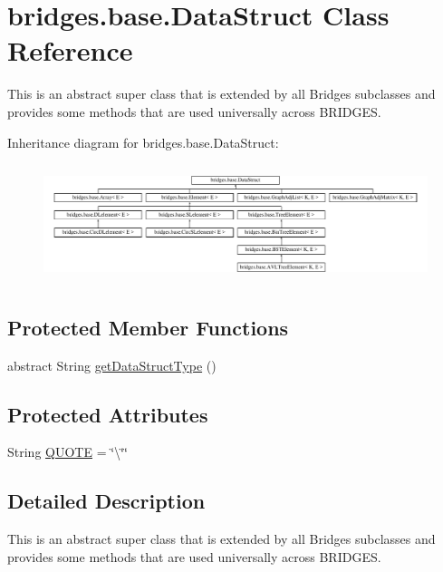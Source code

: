 \hypertarget{classbridges_1_1base_1_1_data_struct}{}\section{bridges.\+base.\+Data\+Struct Class Reference}
\label{classbridges_1_1base_1_1_data_struct}


This is an abstract super class that is extended by all Bridges subclasses and provides some methods that are used universally across B\+R\+I\+D\+G\+ES.  


Inheritance diagram for bridges.\+base.\+Data\+Struct\+:\begin{figure}[H]
\begin{center}
\leavevmode
\includegraphics[height=3.485477cm]{classbridges_1_1base_1_1_data_struct}
\end{center}
\end{figure}
\subsection*{Protected Member Functions}
\begin{DoxyCompactItemize}
\item 
abstract String \hyperlink{classbridges_1_1base_1_1_data_struct_a3bae9d0d68a85e517a34be482e90fdd4}{get\+Data\+Struct\+Type} ()
\end{DoxyCompactItemize}
\subsection*{Protected Attributes}
\begin{DoxyCompactItemize}
\item 
String \hyperlink{classbridges_1_1base_1_1_data_struct_aac4a6ea28f44676274120ba1dddafc1f}{Q\+U\+O\+TE} = \char`\"{}\textbackslash{}\char`\"{}\char`\"{}
\end{DoxyCompactItemize}


\subsection{Detailed Description}
This is an abstract super class that is extended by all Bridges subclasses and provides some methods that are used universally across B\+R\+I\+D\+G\+ES. 

